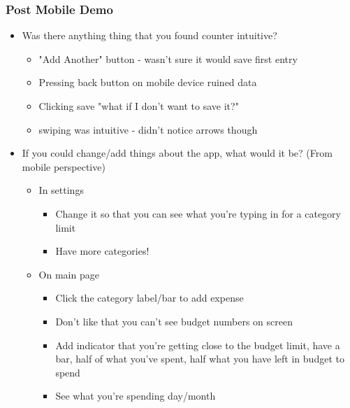 \documentclass{chi2011}
\begin{document}
	\subsubsection{Post Mobile Demo}
	\begin{itemize}[noitemsep]
		\item Was there anything thing that you found counter intuitive?
		\begin{itemize}[noitemsep]
			\item "Add Another" button - wasn't sure it would save first entry
			\item Pressing back button on mobile device ruined data
			\item Clicking save "what if I don't want to save it?"
			\item swiping was intuitive - didn't notice arrows though
		\end{itemize}
		\item If you could change/add things about the app, what would it be? (From mobile perspective)
		\begin{itemize}[noitemsep]
			\item In settings 
			\begin{itemize}[noitemsep]
				\item Change it so that you can see what you're typing in for a category limit
				\item Have more categories!
			\end{itemize}
			\item On main page
			\begin{itemize}[noitemsep]
				\item Click the category label/bar to add expense
				\item Don't like that you can't see budget numbers on screen 
				\item Add indicator that you're getting close to the budget limit, have a bar, half of what
				  you've spent, half what you have left in budget to spend
				\item See what you're spending day/month
			\end{itemize}
		\end{itemize}
	\end{itemize}
\end{document}
